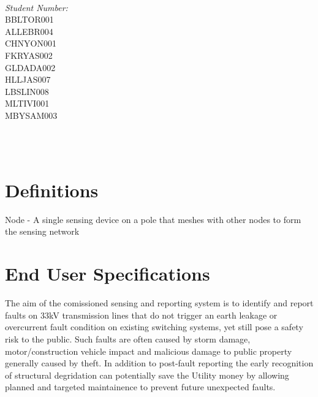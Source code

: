 \documentclass[12pt]{article}
\makeatletter
\let\thedate\@date
\makeatother
\begin{document}
\begin{titlepage}
\begin{minipage}{0.4\textwidth}
\begin{flushleft}
			\end{flushleft}
			\end{minipage}~
			\begin{minipage}{0.4\textwidth}
			\begin{flushright} \large
			\emph{Student Number:} \\
      BBLTOR001\\
      ALLEBR004\\
      CHNYON001\\
      FKRYAS002\\
      GLDADA002\\
      HLLJAS007\\
      LBSLIN008\\
      MLTIVI001\\
      MBYSAM003\\									%
		\end{flushright}
	\end{minipage}\\[0.5 cm]
	
	{\large \thedate}\\[0.5 cm]
 
	\vfill
	
\end{titlepage}


\tableofcontents
\pagebreak


\section{Definitions}

Node - A single sensing device on a pole that meshes with other nodes to form the sensing network

\section{End User Specifications}

The aim of the comissioned sensing and reporting system is to identify and report faults on 33kV transmission lines 
that do not trigger an earth leakage or overcurrent fault condition on existing switching systems, yet still pose 
a safety risk to the public. Such faults are often caused by storm damage, motor/construction vehicle impact and 
malicious damage to public property generally caused by theft. In addition to post-fault reporting the early recognition
of structural degridation can potentially save the Utility money by allowing planned and targeted maintainence to prevent 
future unexpected faults.
\end{document}
